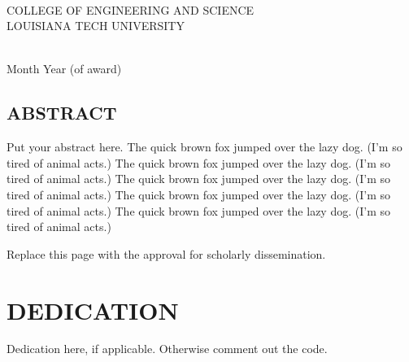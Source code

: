 \begin{center}
~\\

COLLEGE OF ENGINEERING AND SCIENCE\\
\vspace{-.2in}
LOUISIANA TECH UNIVERSITY
\vspace{1in}

~\\

Month Year (of award) \\

\end{center}

\clearpage

\thispagestyle{empty}
\renewcommand{\baselinestretch}{2.0}
\begin{center}
\chapter*{ABSTRACT}
\end{center}

Put your abstract here.
The quick brown fox jumped over the lazy dog.
(I'm so tired of animal acts.)
The quick brown fox jumped over the lazy dog.
(I'm so tired of animal acts.)
The quick brown fox jumped over the lazy dog.
(I'm so tired of animal acts.)
The quick brown fox jumped over the lazy dog.
(I'm so tired of animal acts.)
The quick brown fox jumped over the lazy dog.
(I'm so tired of animal acts.)


\clearpage


Replace this page with the approval for scholarly dissemination.

\clearpage



\chapter*{DEDICATION}%

\vspace{1in}
\begin{center}
Dedication here, if applicable. Otherwise comment out the code.
\end{center}

\clearpage


\tableofcontents

\newpage

\listoffigures

\newpage

\listoftables
